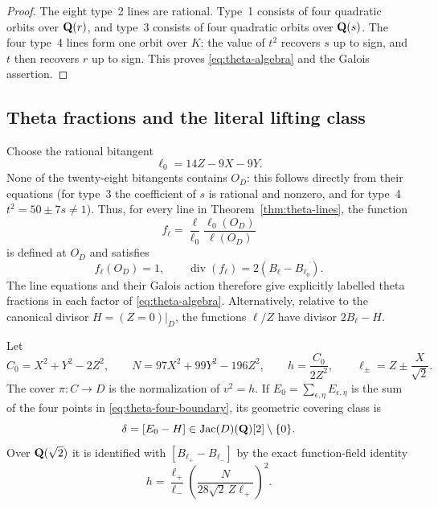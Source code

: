 \begin{proof}
The eight type~2 lines are rational.  Type~1 consists of four quadratic
orbits over $\mathbf Q(r)$, and type~3 consists of four quadratic orbits over
$\mathbf Q(s)$.  The four type~4 lines form one orbit over $K$: the value of
$t^2$ recovers $s$ up to sign, and $t$ then recovers $r$ up to sign.
This proves \eqref{eq:theta-algebra} and the Galois assertion.
\end{proof}

\subsection{Theta fractions and the literal lifting class}

Choose the rational bitangent
\[
 \ell_0=14Z-9X-9Y.
\]
None of the twenty-eight bitangents contains $O_D$: this follows directly
from their equations (for type~3 the coefficient of $s$ is rational and
nonzero, and for type~4 $t^2=50\pm7s\ne1$).  Thus, for every line in
Theorem~\ref{thm:theta-lines}, the function
\begin{equation}
 f_\ell=\frac{\ell}{\ell_0}\frac{\ell_0(O_D)}{\ell(O_D)}
 \label{eq:theta-fractions}
\end{equation}
is defined at $O_D$ and satisfies
\[
 f_\ell(O_D)=1,\qquad
 \operatorname{div}(f_\ell)=2(B_\ell-B_{\ell_0}).
\]
The line equations and their Galois action therefore give explicitly
labelled theta fractions in each factor of \eqref{eq:theta-algebra}.
Alternatively, relative to the canonical divisor $H=(Z=0)|_D$, the
functions $\ell/Z$ have divisor $2B_\ell-H$.

\begin{proposition}
\label{prop:theta-cover-class}
Let
\[
 C_0=X^2+Y^2-2Z^2,\qquad
 N=97X^2+99Y^2-196Z^2,\qquad
 h=\frac{C_0}{2Z^2},\qquad
 \ell_\pm=Z\pm\frac X{\sqrt2}.
\]
The cover $\pi:C\to D$ is the normalization of $v^2=h$.  If
$E_0=\sum_{\epsilon,\eta}E_{\epsilon,\eta}$ is the sum of the four points
in \eqref{eq:theta-four-boundary}, its geometric covering class is
\[
 \delta=[E_0-H]\in\operatorname{Jac}(D)(\mathbf Q)[2]\setminus\{0\}.
\]
Over $\mathbf Q(\sqrt2)$ it is identified with
$[B_{\ell_+}-B_{\ell_-}]$ by the exact function-field identity
\begin{equation}
 h=\frac{\ell_+}{\ell_-}
       \left(\frac{N}{28\sqrt2\,Z\ell_+}\right)^2.
 \label{eq:theta-cover-identity}
\end{equation}
\end{proposition}


